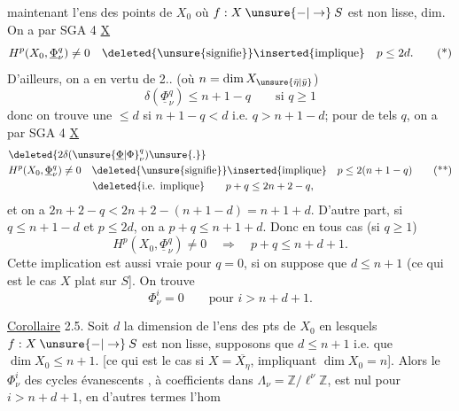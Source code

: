    maintenant  l'ens  des points de $X_0$ où $f:X\mathbin{\unsure{-|\to}}S$ est non lisse,   dim. 
On a   par SGA 4  \uline{X}
\[
H^p(X_0,\underline\Phi^q_\nu)\ne0\quad\deleted{\text{\unsure{signifie}}}\inserted{\text{implique}}\quad p\leq2d.
\tag*{(*)}
\]
D'ailleurs, on a en vertu de 2.. (où $n=\dim X_{\unsure{\bar\eta|\bar y}}$)
\[
\delta(\underline\Phi^q_\nu)\leq n+1-q\qquad\text{si }q\geq1
\]
donc on trouve une   $\leq d$ si $n+1-q<d$ i.e. $q>n+1-d$;  pour de tels $q$, on a par SGA 4 \uline{X}
\[
\begin{aligned}
&\deleted{2\delta({\unsure{\underline\Phi|\Phi}}^q_\nu)\unsure{.}}\\
&H^p(X_0,\underline\Phi^q_\nu)\ne0\quad\deleted{\text{\unsure{signifie}}}\inserted{\text{implique}}\quad p\leq2(n+1-q)\\
&\hspace{8em}\deleted{\text{i.e. implique}}\qquad p+q\leq2n+2-q,
\end{aligned}
\tag*{(**)}
\]
et on a  $2n+2-q<2n+2-(n+1-d)=n+1+d$. 
D'autre part, si $q\leq n+1-d$ et  $p\leq2d$, on a $p+q\leq n+1+d$. Donc en tous cas (si $q\geq1$)
\[
H^p(X_0,\underline\Phi^q_\nu)\ne0\quad\Longrightarrow\quad p+q\leq n+d+1.
\]
 Cette implication est aussi vraie pour $q=0$, si on suppose que $d\leq n+1$ (ce qui est le cas    $X$ plat sur $S$]. On trouve 
\[
\Phi^i_\nu=0\qquad\text{pour }i>n+d+1.
\]

\uline{Corollaire} 2.5.  Soit $d$ la dimension de l'ens des pts de $X_0$ en lesquels $f:X\mathbin{\unsure{-|\to}}S$ est non lisse,   supposons que $d\leq n+1$ i.e. que $\dim X_0\leq n+1$. [ce qui est le cas si $X=\overline{X_\eta}$, impliquant $\dim X_0=n$]. Alors le  $\Phi^i_\nu$ des cycles évanescents , à coefficients dans $\Lambda_\nu=\mathbb Z/\ell^\nu\mathbb Z$, est nul pour  $i>n+d+1$, en d'autres termes l'hom
